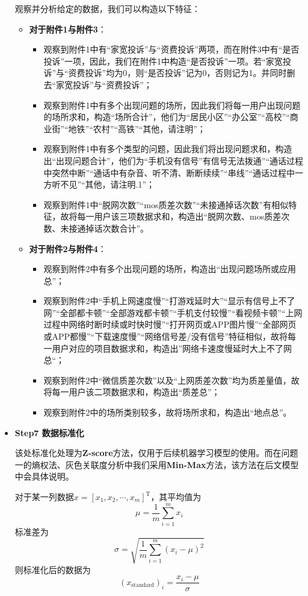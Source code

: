 \documentclass{MathorCupmodeling}
\begin{document}
\begin{itemize}
		观察并分析给定的数据，我们可以构造以下特征：
		\begin{itemize}
			\item \textbf{对于附件1与附件3}：
			\begin{itemize}
				\item 观察到附件1中有“家宽投诉”与“资费投诉”两项，而在附件3中有“是否投诉”一项，因此，我们在附件1中构造“是否投诉”一项。若“家宽投诉”与“资费投诉”均为0，则“是否投诉”记为0，否则记为1。并同时删去“家宽投诉”与“资费投诉”；
				\item 观察到附件1中有多个出现问题的场所，因此我们将每一用户出现问题的场所求和，构造“场所合计”，他们为“居民小区”“办公室”“高校”“商业街”“地铁”“农村”“高铁”“其他，请注明”；
				\item 观察到附件1中有多个类型的问题，因此我们将出现问题求和，构造出“出现问题合计”，他们为“手机没有信号”有信号无法拨通”“通话过程中突然中断”“通话中有杂音、听不清、断断续续”“串线”“通话过程中一方听不见”“其他，请注明.1”；
				\item 观察到附件1中“脱网次数”“mos质差次数”“未接通掉话次数”有相似特征，故将每一用户该三项数据求和，构造出“脱网次数、mos质差次数、未接通掉话次数合计”。
			\end{itemize}
			\item \textbf{对于附件2与附件4}：
			\begin{itemize}
				\item 观察到附件2中有多个出现问题的场所，构造出“出现问题场所或应用总”；
				\item 观察到附件2中“手机上网速度慢”“打游戏延时大”“显示有信号上不了网”“全部都卡顿”“全部游戏都卡顿”“手机支付较慢”“看视频卡顿”“上网过程中网络时断时续或时快时慢”“打开网页或APP图片慢”“全部网页或APP都慢”“下载速度慢”“网络信号差/没有信号”特征相似，故将每一用户对应的项目数据求和，构造出”网络卡速度慢延时大上不了网总“；
				\item 观察到附件2中“微信质差次数”以及“上网质差次数”均为质差量值，故将每一用户该二项数据求和，构造出“质差总”；
				\item 观察到附件2中的场所类别较多，故将场所求和，构造出“地点总”。
			\end{itemize}
		\end{itemize}

		\item \textbf{Step7 数据标准化}
		
		该处标准化处理为\textbf{Z-score}方法，仅用于后续机器学习模型的使用。而在问题一的熵权法、灰色关联度分析中我们采用\textbf{Min-Max}方法，该方法在后文模型中会具体说明。

		对于某一列数据$x=\left[x_1,x_2,\cdots,x_m\right]^{\mathrm{T}}$，其平均值为
		\begin{equation}
			\mu=\frac{1}{m}\sum_{i=1}^{m}x_i \label{fmean}
		\end{equation}
		标准差为
		\begin{equation}
			\sigma=\sqrt{\frac{1}{m}\sum_{i=1}^{m}\left(x_i-\mu\right)^2} \label{fstd}
		\end{equation}
		则标准化后的数据为
		\begin{equation}
		\left(x_{\mathrm{standard}}\right)_i=\frac{x_i-\mu}{\sigma} \label{fstandardprocess}
		\end{equation}


\end{itemize}
\end{document}
